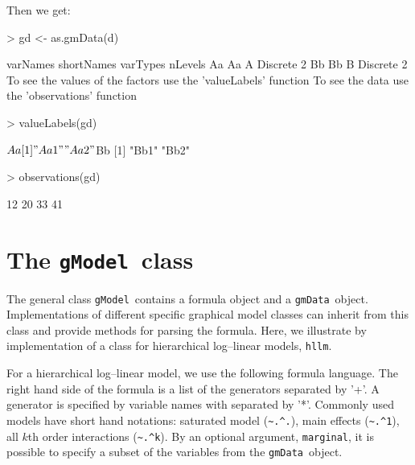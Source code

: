 \documentclass{article}
\def\code#1{\texttt{#1}}
\def\gmData            {\code{gmData}}
\def\gmData             {\code{gmData}}
\def\gModel             {\code{gModel}} %
\begin{document}
Then we get:
\footnotesize
\begin{Schunk}
\begin{Sinput}
> gd <- as.gmData(d)
\end{Sinput}
\begin{Soutput}
   varNames shortNames varTypes nLevels
Aa       Aa          A Discrete       2
Bb       Bb          B Discrete       2
To see the values of the factors use the 'valueLabels' function
To see the data use the 'observations' function
\end{Soutput}
\begin{Sinput}
> valueLabels(gd)
\end{Sinput}
\begin{Soutput}
$Aa
[1] "Aa1" "Aa2"

$Bb
[1] "Bb1" "Bb2"
\end{Soutput}
\begin{Sinput}
> observations(gd)
\end{Sinput}
\begin{Soutput}
[1] 12 20 33 41
\end{Soutput}
\end{Schunk}
\normalsize


\section[The gModel class]{The \protect \gModel\ class}
\label{sec:gmodel}

The general class \gModel\ contains a formula object and a \gmData\
object. Implementations of different specific graphical model classes
can inherit from this class and provide methods for parsing the
formula. Here, we illustrate by implementation of a class for
hierarchical log--linear models, \code{hllm}.

For a hierarchical log--linear model, we use the following formula
language. The right hand side of the formula is a list of the
generators separated by '+'. A generator is specified by variable
names with separated by '*'. Commonly used models have short hand
notations: saturated model (\verb|~.^.|), main effects (\verb|~.^1|),
all $k$th order interactions (\verb|~.^k|). By an optional argument,
\code{marginal}, it is possible to specify a subset of the variables
from the \gmData\ object.
\end{document}

